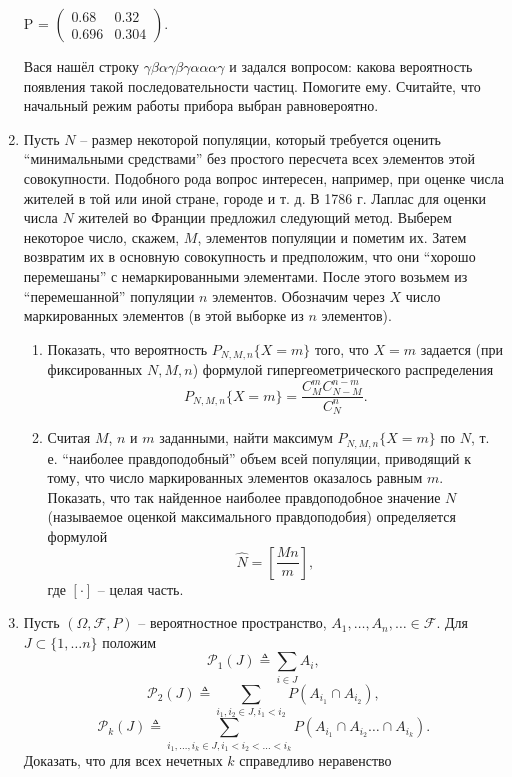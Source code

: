 \documentclass[a4paper, 14pt]{extarticle}
\begin{document}
\begin{enumerate}
\begin{center}
    P = $\left ( \begin{array}{cc}
        0.68 & 0.32 \\
        0.696 & 0.304
    \end{array} \right ).$
\end{center}

Вася нашёл строку $\gamma \beta \alpha \gamma \beta \gamma \alpha \alpha \alpha \gamma$ и задался вопросом: какова вероятность появления такой последовательности частиц. Помогите ему. Считайте, что начальный режим работы прибора выбран равновероятно.
	\item Пусть $N$ -- размер некоторой популяции, который требуется 
	оценить ``минимальными средствами'' без простого пересчета всех элементов
	этой совокупности. Подобного рода вопрос интересен, например, при 
	оценке числа жителей в той или иной стране, городе и т. д.
	В 1786 г. Лаплас для оценки числа $N$ жителей во Франции предложил
	следующий метод.
	Выберем некоторое число, скажем, $M$, элементов популяции и пометим
	их. Затем возвратим их в основную совокупность и предположим, что
	они ``хорошо перемешаны'' с немаркированными элементами. После этого
	возьмем из ``перемешанной'' популяции $n$ элементов. Обозначим через $X$
	число маркированных элементов (в этой выборке из $n$ элементов).
	\begin{enumerate}
		\item Показать, что вероятность $P_{N,M,n}\{X = m\}$ того, что $X=m$ задается
		(при фиксированных $N,M,n$) формулой гипергеометрического 
		распределения
		$$P_{N,M,n}\{X = m\}=\frac{C_{M}^mC_{N-M}^{n-m}}{C_N^n}. $$
		\item Считая $M$, $n$ и $m$ заданными, найти максимум $P_{N,M,n}\{X = m\}$ по $N$,
		т. е. ``наиболее правдоподобный'' объем всей популяции, приводящий к
		тому, что число маркированных элементов оказалось равным $m$.
		Показать, что так найденное наиболее правдоподобное значение $N$ 
		(называемое оценкой максимального правдоподобия) определяется 
		формулой $$\widehat{N}=\left[\frac{Mn}{m}\right], $$
		где $[\cdot]$ -- целая часть.
	\end{enumerate}
		\item Пусть $(\Omega,\mathcal{F},P)$ -- вероятностное пространство, $A_1,\ldots, A_n,\ldots\in\mathcal{F}$. Для $J\subset \{1,\ldots n\}$ положим
	$$\mathcal{P}_1(J)\triangleq \sum_{i\in J}A_i, $$
	$$\mathcal{P}_{2}(J)\triangleq \sum_{i_1,i_2\in J,i_1<i_2}P(A_{i_1}\cap A_{i_2}), $$
	$$\mathcal{P}_k(J)\triangleq \sum_{i_1,\ldots,i_k\in J,i_1<i_2<\ldots<i_k}P(A_{i_1}\cap A_{i_2} \ldots\cap A_{i_k}). $$ Доказать, что для всех нечетных $k$ справедливо неравенство

\end{enumerate}
\end{document}
